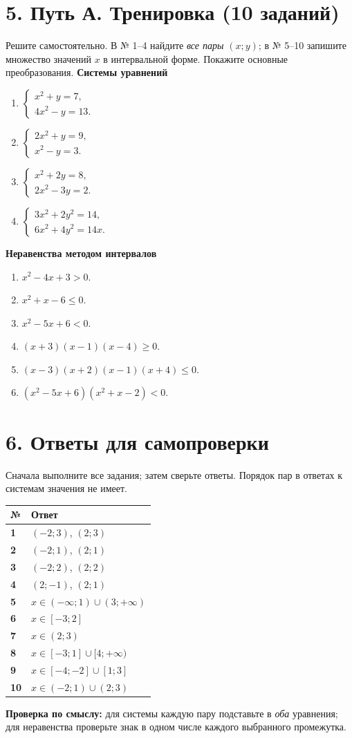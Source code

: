 \documentclass[a4paper,12pt]{article}
\newcommand{\key}[1]{{\color{darkaccent}\textbf{#1}}}
\newcommand{\note}[1]{{\small\color{quiet}#1}}
\newcommand{\headsec}[1]{\section*{\color{darkaccent}#1}\vspace{-6pt}{\color{hairline}\rule{\linewidth}{0.55pt}}\par\vspace{1pt}}
\newcommand{\task}[1]{\item #1\vspace{3pt}}
\begin{document}
\clearpage
\headsec{5. Путь А. Тренировка (10 заданий)}
\note{Решите самостоятельно. В № 1--4 найдите \emph{все пары} \((x;y)\); в № 5--10 запишите множество значений \(x\) в интервальной форме. Покажите основные преобразования.}
\vspace{2mm}
\textbf{Системы уравнений}
\begin{enumerate}[label=\textbf{\arabic*.},start=1]
\task{$\displaystyle\begin{cases}x^2+y=7,\\4x^2-y=13.\end{cases}$}
\task{$\displaystyle\begin{cases}2x^2+y=9,\\x^2-y=3.\end{cases}$}
\task{$\displaystyle\begin{cases}x^2+2y=8,\\2x^2-3y=2.\end{cases}$}
\task{$\displaystyle\begin{cases}3x^2+2y^2=14,\\6x^2+4y^2=14x.\end{cases}$}
\end{enumerate}
\textbf{Неравенства методом интервалов}
\begin{enumerate}[label=\textbf{\arabic*.},start=5]
\task{$x^2-4x+3>0$.}
\task{$x^2+x-6\le0$.}
\task{$x^2-5x+6<0$.}
\task{$(x+3)(x-1)(x-4)\ge0$.}
\task{$(x-3)(x+2)(x-1)(x+4)\le0$.}
\task{$(x^2-5x+6)(x^2+x-2)<0$.}
\end{enumerate}

\clearpage
\headsec{6. Ответы для самопроверки}
\note{Сначала выполните все задания; затем сверьте ответы. Порядок пар в ответах к системам значения не имеет.}\par
\renewcommand{\arraystretch}{1.55}
\begin{tabularx}{\linewidth}{@{}>{\bfseries}p{12mm}X@{}}
\toprule
№ & Ответ\\
\midrule
1 & $(-2;3)$, $(2;3)$\\
2 & $(-2;1)$, $(2;1)$\\
3 & $(-2;2)$, $(2;2)$\\
4 & $(2;-1)$, $(2;1)$\\
5 & $x\in(-\infty;1)\cup(3;+\infty)$\\
6 & $x\in[-3;2]$\\
7 & $x\in(2;3)$\\
8 & $x\in[-3;1]\cup[4;+\infty)$\\
9 & $x\in[-4;-2]\cup[1;3]$\\
10 & $x\in(-2;1)\cup(2;3)$\\
\bottomrule
\end{tabularx}\par
\vspace{8mm}
\key{Проверка по смыслу:}
для системы каждую пару подставьте в \emph{оба} уравнения;
для неравенства проверьте знак в одном числе каждого выбранного промежутка.
\end{document}
